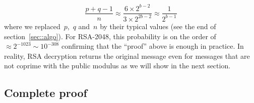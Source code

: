 \documentclass{article}
\begin{document}
\begin{equation*}
\dfrac{p + q - 1}{n} \approx \dfrac{6 \times 2^{b-2}}{3\times 2^{2b - 2}} \approx \dfrac{1}{2^{b-1}}    
\end{equation*}
where we replaced~$p$,~$q$ and~$n$ by their typical values (see the end of section~\ref{sec::algo}).  For RSA-2048, this probability is on the order of~$\approx 2^{-1023} \sim 10^{-308}$ confirming that the ``proof'' above is enough in practice.  In reality, RSA decryption returns the original message even for messages that are not coprime with the public modulus as we will show in the next section.

\subsection{Complete proof}
\end{document}
